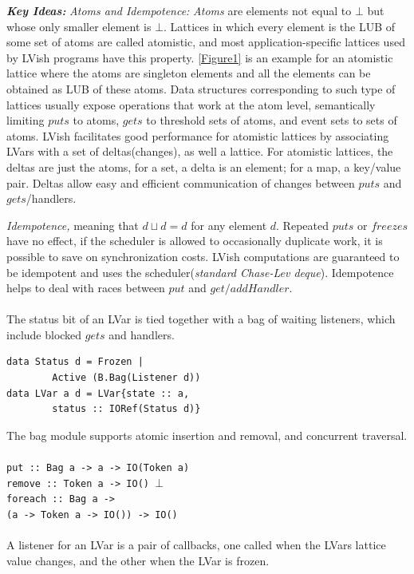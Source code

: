 \documentclass[twocolumn]{article}
\begin{document}
\textbf{\textit{Key Ideas:}} \textit{Atoms and Idempotence:} \textit{Atoms} are elements not equal to $\bot$ but whose only smaller element is $\bot$. Lattices in which every element is the LUB of some set of atoms are called atomistic, and most application-specific lattices used by LVish programs have this property. \ref{Figure1} is an example for an atomistic lattice where the atoms are singleton elements and all the elements can be obtained as LUB of these atoms. Data structures corresponding to such type of lattices usually expose operations that work at the atom level, semantically limiting $puts$ to atoms, $gets$ to threshold sets of atoms, and event sets to sets of atoms. LVish facilitates good performance for atomistic lattices by associating LVars with a set of deltas(changes), as well a lattice. For atomistic lattices, the deltas are just the atoms, for a set, a delta is an element; for a map, a key/value pair. Deltas allow easy and efficient communication of changes between $puts$ and $gets$/handlers. \par
\textit{Idempotence,} meaning that $d\sqcup{d=d}$ for any element $d$. Repeated $puts$ or $freezes$ have no effect, if the scheduler is allowed to occasionally duplicate work, it is possible to save on synchronization costs. LVish computations are guaranteed to be idempotent and uses the scheduler(\textit{standard Chase-Lev deque}). Idempotence helps to deal with races between $put$ and $get/addHandler$. \\ \\ 
The status bit of an LVar is tied together with a bag of waiting listeners, which include blocked $gets$ and handlers.
\begin{verbatim}
data Status d = Frozen |
	    Active (B.Bag(Listener d))
data LVar a d = LVar{state :: a,
	    status :: IORef(Status d)} 
\end{verbatim}
The bag module supports atomic insertion and removal, and concurrent traversal.\\ \\
\texttt{put :: Bag a -> a -> IO(Token a)\\
remove :: Token a -> IO() $\bot$\\
foreach :: Bag a ->\\
   (a -> Token a -> IO()) -> IO()}\\ \\
A listener for an LVar is a pair of callbacks, one called when the LVars lattice value changes, and the other when the LVar is frozen. 
\end{document}
